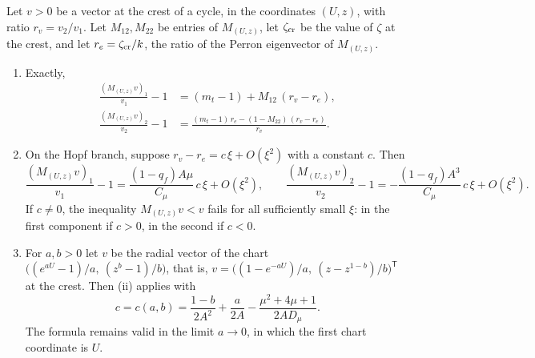 \begin{proposition}\label{neg:prop:charts}
Let $v>0$ be a vector at the crest of a cycle, in the coordinates $(U,z)$, with ratio $r_v=v_2/v_1$. Let $M_{12},M_{22}$ be entries of $M_{(U,z)}$, let $\zeta_{\rm cr}$ be the value of $\zeta$ at the crest, and let $r_e=\zeta_{\rm cr}/k$, the ratio of the Perron eigenvector of $M_{(U,z)}$.
\begin{enumerate}[label=\textup{(\roman*)}]
\item Exactly,
\begin{equation}\label{neg:eq:twocomponents}
\begin{aligned}
\frac{(M_{(U,z)}v)_1}{v_1}-1&=(m_t-1)+M_{12}\,(r_v-r_e),\\
\frac{(M_{(U,z)}v)_2}{v_2}-1&=\frac{(m_t-1)\,r_e-(1-M_{22})\,(r_v-r_e)}{r_v}.
\end{aligned}
\end{equation}
\item On the Hopf branch, suppose $r_v-r_e=c\,\xi+O(\xi^2)$ with a constant $c$. Then
\[
\frac{(M_{(U,z)}v)_1}{v_1}-1=\frac{(1-q_f)A\mu}{C_\mu}\,c\,\xi+O(\xi^2),\qquad
\frac{(M_{(U,z)}v)_2}{v_2}-1=-\frac{(1-q_f)A^3}{C_\mu}\,c\,\xi+O(\xi^2).
\]
If $c\ne0$, the inequality $M_{(U,z)}v<v$ fails for all sufficiently small $\xi$: in the first component if $c>0$, in the second if $c<0$.
\item For $a,b>0$ let $v$ be the radial vector of the chart $\bigl((e^{aU}-1)/a,\ (z^{b}-1)/b\bigr)$, that is,
$v=\bigl((1-e^{-aU})/a,\ (z-z^{1-b})/b\bigr)^{\mathsf T}$ at the crest. Then (ii) applies with
\begin{equation}\label{neg:eq:chartmismatch}
c=c(a,b)=\frac{1-b}{2A^2}+\frac{a}{2A}-\frac{\mu^2+4\mu+1}{2AD_\mu}.
\end{equation}
The formula remains valid in the limit $a\to0$, in which the first chart coordinate is $U$.
\end{enumerate}
\end{proposition}
